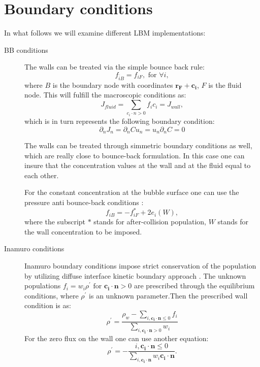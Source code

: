 \documentclass{article}
\begin{document}
\section{Boundary conditions}
In what follows we will examine different LBM implementations:
\begin{description}
 \item[BB conditions] The walls can be treated via the simple bounce back rule:
\begin{equation}
f_{\bar{i}B}=f_{iF},\text{ for } \forall i,
\end{equation}
where $B$ is the boundary node with coordinates $\bm{r_F}+\bm{c_i}$, $F$ is the fluid node. This
will fulfill the macroscopic conditions as:
\begin{equation}
J_{fluid}= \sum_{c_i\cdot n>0}{f_i c_i}=J_{wall},
\end{equation}
which is in turn represents the following boundary condition:
\begin{equation}
\partial_n J_n=\partial_n C u_n = u_n \partial_n C=0
\end{equation}

The walls can be treated through simmetric boundary conditions as well, which are really close to
bounce-back formulation. In this case one can insure that the concentration values at the wall and
at the fluid equal to each other. 

For the constant concentration at the bubble surface one can use the pressure anti
bounce-back conditions
\cite{ginzburg-boundary-main}:
\begin{equation}
f_{iB}=-f^{*}_{iF}+2 e_i(W),
\end{equation}
where the subscript $*$ stands for after-collision population, $W$ stands for the wall
concentration to be imposed.
\item[Inamuro conditions] Inamuro boundary conditions impose strict conservation of the population
by utilizing diffuse interface kinetic boundary approach \cite{inamuro-scalar-boundary}. The
unknown populations $f_i=w_i \rho^{\prime}\text{ for } \bm{c_i}\cdot \bm{n}>0$ are prescribed
through the equilibrium conditions, where $\rho^{\prime}$ is an unknown parameter.Then the
prescribed wall condition is as: 
\begin{equation}
\rho^{\prime}=\frac{\rho_{w}-\sum_{i,\bm{c_i}\cdot\bm{n}\leq0}
f_i}{\sum_{i,\bm{c_i}\cdot\bm{n}>0}w_i}
\end{equation}
For the zero flux on the wall one can use another equation:
\begin{equation}
\rho^{\prime}=-\frac{i,\bm{c_i}\cdot\bm{n}\leq0}{\sum_{i,\bm{c_i}\cdot \bm{n}}{w_i \bm{c_i}\cdot
\bm{n}}}.
\end{equation}
\end{description}
\end{document}
